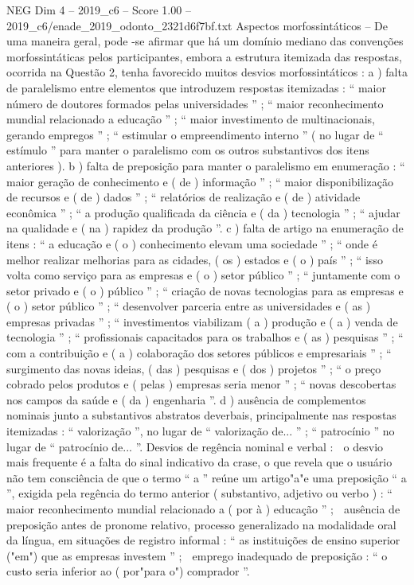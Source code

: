 \begin{textsample}{NEG Dim 4 – 2019\_c6 – Score 1.00 – 2019\_c6/enade\_2019\_odonto\_2321d6f7bf.txt}
Aspectos morfossintáticos – De uma maneira geral, pode -se afirmar que há um domínio mediano das convenções morfossintáticas pelos participantes, embora a estrutura itemizada das respostas, ocorrida na Questão 2, tenha favorecido muitos desvios morfossintáticos : a ) falta de paralelismo entre elementos que introduzem respostas itemizadas : “ maior número de doutores formados pelas universidades ” ; “ maior reconhecimento mundial relacionado a educação ” ; “ maior investimento de multinacionais, gerando empregos ” ; “ estimular o empreendimento interno ” ( no lugar de “ estímulo ” para manter o paralelismo com os outros substantivos dos itens anteriores ). b ) falta de preposição para manter o paralelismo em enumeração : “ maior geração de conhecimento e ( de ) informação ” ; “ maior disponibilização de recursos e ( de ) dados ” ; “ relatórios de realização e ( de ) atividade econômica ” ; “ a produção qualificada da ciência e ( da ) tecnologia ” ; “ ajudar na qualidade e ( na ) rapidez da produção ”. c ) falta de artigo na enumeração de itens : “ a educação e ( o ) conhecimento elevam uma sociedade ” ; “ onde é melhor realizar melhorias para as cidades, ( os ) estados e ( o ) país ” ; “ isso volta como serviço para as empresas e ( o ) setor público ” ; “ juntamente com o setor privado e ( o ) público ” ; “ criação de novas tecnologias para as empresas e ( o ) setor público ” ; “ desenvolver parceria entre as universidades e ( as ) empresas privadas ” ; “ investimentos viabilizam ( a ) produção e ( a ) venda de tecnologia ” ; “ profissionais capacitados para os trabalhos e ( as ) pesquisas ” ; “ com a contribuição e ( a ) colaboração dos setores públicos e empresariais ” ; “ surgimento das novas ideias, ( das ) pesquisas e ( dos ) projetos ” ; “ o preço cobrado pelos produtos e ( pelas ) empresas seria menor ” ; “ novas descobertas nos campos da saúde e ( da ) engenharia ”. d ) ausência de complementos nominais junto a substantivos abstratos deverbais, principalmente nas respostas itemizadas : “ valorização ”, no lugar de “ valorização de... ” ; “ patrocínio ” no lugar de “ patrocínio de... ”.
Desvios de regência nominal e verbal :  o desvio mais frequente é a falta do sinal indicativo da crase, o que revela que o usuário não tem consciência de que o termo “ a ” reúne um artigo"a"e uma preposição “ a ”, exigida pela regência do termo anterior ( substantivo, adjetivo ou verbo ) : “ maior reconhecimento mundial relacionado a ( por à ) educação ” ;  ausência de preposição antes de pronome relativo, processo generalizado na modalidade oral da língua, em situações de registro informal : “ as instituições de ensino superior ("em") que as empresas investem ” ;  emprego inadequado de preposição : “ o custo seria inferior ao ( por"para o") comprador ”.

\end{textsample}
